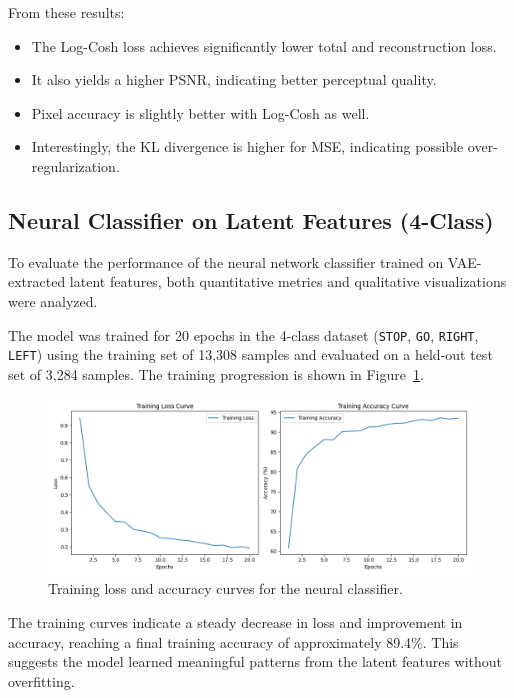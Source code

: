 From these results:

\begin{itemize}
    \item The Log-Cosh loss achieves significantly lower total and reconstruction loss.
    \item It also yields a higher PSNR, indicating better perceptual quality.
    \item Pixel accuracy is slightly better with Log-Cosh as well.
    \item Interestingly, the KL divergence is higher for MSE, indicating possible over-regularization.
\end{itemize}






\subsection{Neural Classifier on Latent Features (4-Class)}

To evaluate the performance of the neural network classifier trained on VAE-extracted latent features, both quantitative metrics and qualitative visualizations were analyzed.

The model was trained for 20 epochs in the 4-class dataset (\texttt{STOP}, \texttt{GO}, \texttt{RIGHT}, \texttt{LEFT}) using the training set of 13,308 samples and evaluated on a held-out test set of 3,284 samples. The training progression is shown in Figure~\ref{fig:loss_accuracy_plot}.

\begin{figure}[h]
    \centering
    \includegraphics[width=\textwidth]{img/classifier/training_loss_accuracy_4_classes.png}
    \caption{Training loss and accuracy curves for the neural classifier.}
    \label{fig:loss_accuracy_plot}
\end{figure}

The training curves indicate a steady decrease in loss and improvement in accuracy, reaching a final training accuracy of approximately 89.4\%. This suggests the model learned meaningful patterns from the latent features without overfitting.

